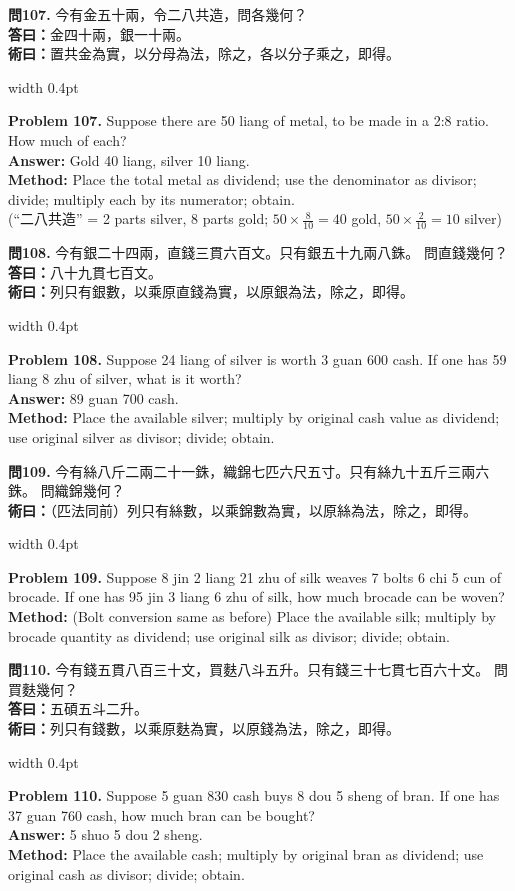 \documentclass[10pt,a4paper]{article}
\newlength{\cnwidth}
\newlength{\enwidth}
\newcommand{\bilingual}[2]{%
  \noindent%
  \begin{minipage}[t]{\cnwidth}%
    #1%
  \end{minipage}%
  \hfill\vrule width 0.4pt\hfill%
  \begin{minipage}[t]{\enwidth}%
    #2%
  \end{minipage}%
  \par\smallskip%
}
\begin{document}
\bilingual{%
  \textbf{問107.}
  今有金五十兩，令二八共造，問各幾何？\\
  \textbf{答曰：}金四十兩，銀一十兩。\\
  \textbf{術曰：}置共金為實，以分母為法，除之，各以分子乘之，即得。
}{%
  \textbf{Problem 107.}
  Suppose there are 50 liang of metal, to be made in a 2:8 ratio.
  How much of each?\\
  \textbf{Answer:} Gold 40 liang, silver 10 liang.\\
  \textbf{Method:} Place the total metal as dividend; use the denominator as divisor;
  divide; multiply each by its numerator; obtain.\\
  (``二八共造'' = 2 parts silver, 8 parts gold; $50 \times \frac{8}{10} = 40$ gold,
  $50 \times \frac{2}{10} = 10$ silver)
}

\bilingual{%
  \textbf{問108.}
  今有銀二十四兩，直錢三貫六百文。只有銀五十九兩八銖。
  問直錢幾何？\\
  \textbf{答曰：}八十九貫七百文。\\
  \textbf{術曰：}列只有銀數，以乘原直錢為實，以原銀為法，除之，即得。
}{%
  \textbf{Problem 108.}
  Suppose 24 liang of silver is worth 3 guan 600 cash.
  If one has 59 liang 8 zhu of silver, what is it worth?\\
  \textbf{Answer:} 89 guan 700 cash.\\
  \textbf{Method:} Place the available silver; multiply by original cash value as
  dividend; use original silver as divisor; divide; obtain.
}

\bilingual{%
  \textbf{問109.}
  今有絲八斤二兩二十一銖，織錦七匹六尺五寸。只有絲九十五斤三兩六銖。
  問織錦幾何？\\
  \textbf{術曰：}（匹法同前）列只有絲數，以乘錦數為實，以原絲為法，除之，即得。
}{%
  \textbf{Problem 109.}
  Suppose 8 jin 2 liang 21 zhu of silk weaves 7 bolts 6 chi 5 cun of brocade.
  If one has 95 jin 3 liang 6 zhu of silk, how much brocade can be woven?\\
  \textbf{Method:} (Bolt conversion same as before) Place the available silk;
  multiply by brocade quantity as dividend; use original silk as divisor;
  divide; obtain.
}

\bilingual{%
  \textbf{問110.}
  今有錢五貫八百三十文，買麩八斗五升。只有錢三十七貫七百六十文。
  問買麩幾何？\\
  \textbf{答曰：}五碩五斗二升。\\
  \textbf{術曰：}列只有錢數，以乘原麩為實，以原錢為法，除之，即得。
}{%
  \textbf{Problem 110.}
  Suppose 5 guan 830 cash buys 8 dou 5 sheng of bran.
  If one has 37 guan 760 cash, how much bran can be bought?\\
  \textbf{Answer:} 5 shuo 5 dou 2 sheng.\\
  \textbf{Method:} Place the available cash; multiply by original bran as dividend;
  use original cash as divisor; divide; obtain.
}
\end{document}
